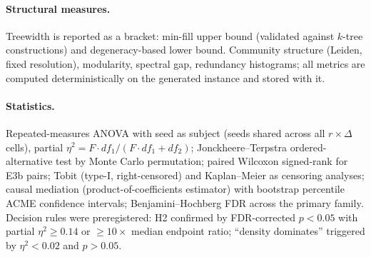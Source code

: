\documentclass[manuscript, screen, review]{jair}
\begin{document}
\paragraph{Structural measures.}
Treewidth is reported as a bracket: min-fill upper bound (validated against
$k$-tree constructions) and degeneracy-based lower bound. Community structure
(Leiden, fixed resolution), modularity, spectral gap, redundancy histograms;
all metrics are computed deterministically on the generated instance and
stored with it.

\paragraph{Statistics.}
Repeated-measures ANOVA with seed as subject (seeds shared across all
$r\times\Delta$ cells), partial $\eta^2 = F\cdot df_1/(F\cdot df_1+df_2)$;
Jonckheere--Terpstra ordered-alternative test by Monte Carlo permutation;
paired Wilcoxon signed-rank for E3b pairs; Tobit (type-I, right-censored) and
Kaplan--Meier as censoring analyses; \citet{imai2011} causal mediation
(product-of-coefficients estimator) with bootstrap percentile ACME confidence
intervals; Benjamini--Hochberg FDR across the
primary family. Decision rules were preregistered: H2 confirmed by
FDR-corrected $p<0.05$ with partial $\eta^2 \ge 0.14$ or $\ge 10\times$
median endpoint ratio; ``density dominates'' triggered by $\eta^2<0.02$ and
$p>0.05$.
\end{document}
